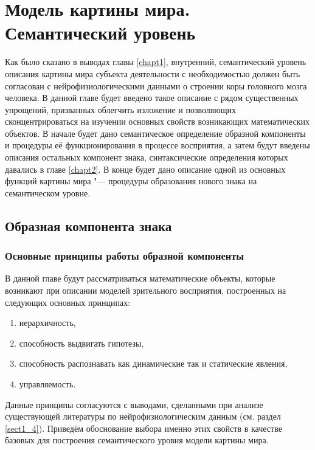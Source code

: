 \chapter{Модель картины мира. Семантический уровень} \label{chapt3}

Как было сказано в выводах главы \ref{chapt1}, внутренний, семантический уровень описания картины мира субъекта деятельности с необходимостью должен быть согласован с нейрофизиологическими данными о строении коры головного мозга человека. В данной главе будет введено такое описание с рядом существенных упрощений, призванных облегчить изложение и позволяющих сконцентрироваться на изучении основных свойств возникающих математических объектов. В начале будет дано семантическое определение образной компоненты и процедуры её функционирования в процессе восприятия, а затем будут введены описания остальных компонент знака, синтаксические определения которых давались в главе \ref{chapt2}. В конце будет дано описание одной из основных функций картины мира "--- процедуры образования нового знака на семантическом уровне.

\section{Образная компонента знака}\label{sect3_1}

\subsection{Основные принципы работы образной компоненты} \label{subsect3_1_1}

В данной главе будут рассматриваться математические объекты, которые возникают при описании моделей зрительного восприятия, построенных на следующих основных принципах:
\begin{enumerate}
\item 
	иерархичность,
\item
	способность выдвигать гипотезы,
\item
	способность распознавать как динамические так и статические явления,
\item
	управляемость.
\end{enumerate}
Данные принципы согласуются с выводами, сделанными при анализе существующей литературы по нейрофизиологическим данным (см. раздел \ref{sect1_4}). Приведём обоснование выбора именно этих свойств в качестве базовых для построения семантического уровня модели картины мира.

